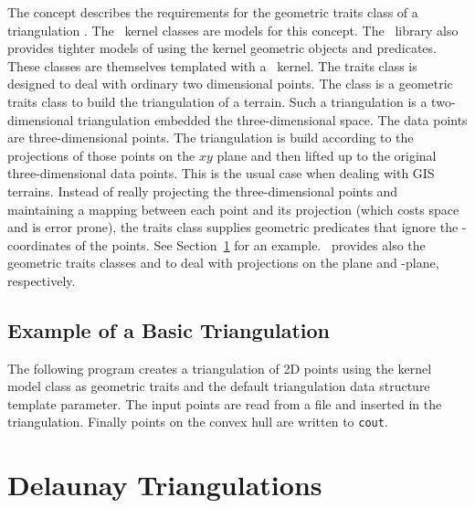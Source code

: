 The concept
  describes the requirements for the 
geometric traits class of a triangulation 
.
 The \cgal\  kernel classes 
are models for  this  concept.
The \cgal\  library also provides tighter models
of  
using the kernel geometric objects and predicates.
These classes are themselves templated with a \cgal\  kernel.
The traits class 
is designed to deal with ordinary  two dimensional points.
The class  
is a geometric traits class to build the triangulation
of a terrain. Such a triangulation is a two-dimensional
triangulation embedded  the three-dimensional space.
The data points are three-dimensional points.
The triangulation is 
build according to  the projections of those points
on the $xy$ plane  and then lifted up to the original
three-dimensional data points.
This is the usual case when dealing with GIS terrains.
Instead of really projecting the  three-dimensional points and
maintaining a mapping between each point and its projection
 (which costs space and is error prone),
the traits class  supplies geometric predicates that ignore the
-coordinates of the points.
See Section~\ref{Section_2D_Triangulations_Delaunay} for an example.
\cgal\ provides also the geometric traits classes
 and
 to
deal with projections on the
  plane  and  -plane,
respectively.

\subsection{Example of a Basic Triangulation}
\label{Subsection_2D_Triangulations_Basic_Example}

The following program  creates a  triangulation of 2D points
using the kernel model class 
as geometric traits and the default triangulation data structure
template parameter.
 The input points are read from a file 
and inserted in the triangulation.
Finally points on the convex hull are written to {\tt cout}. 


\section{Delaunay Triangulations}
\label{Section_2D_Triangulations_Delaunay}

